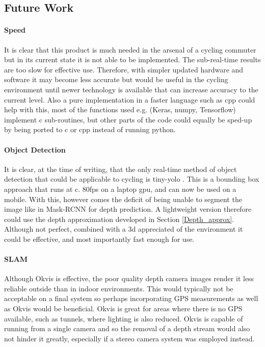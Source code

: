 \documentclass[11pt,twoside]{report}
\begin{document}
\subsection{Future Work}

\paragraph{Speed} It is clear that this product is much needed in the arsenal of a cycling commuter but in its current state it is not able to be implemented. The sub-real-time results are too slow for effective use. Therefore, with simpler updated hardware and software it may become less accurate but would be useful in the cycling environment until newer technology is available that can increase accuracy to the current level. Also a pure implementation in a faster language such as cpp could help with this, most of the functions used e.g. (Keras, numpy, Tensorflow) implement c sub-routines, but other parts of the code could equally be sped-up by being ported to c or cpp instead of running python.

\paragraph{Object Detection} It is clear, at the time of writing, that the only real-time method of object detection that could be applicable to cycling is tiny-yolo \cite{DBLP:journals/corr/RedmonDGF15}. This is a bounding box approach that runs at c. 80fps on a laptop gpu, and can now be used on a mobile. With this, however comes the deficit of being unable to segment the image like in Mask-RCNN for depth prediction. A lightweight version therefore could use the depth approximation developed in Section \ref{Depth_approx}. Although not perfect, combined with a 3d appreciated of the environment it could be effective, and most importantly fast enough for use. 

\paragraph{SLAM} Although Okvis is effective, the poor quality depth camera images render it less reliable outside than in indoor environments. This would typically not be acceptable on a final system so perhaps incorporating GPS measurements as well as Okvis would be beneficial. Okvis is great for areas where there is no GPS available, such as tunnels, where lighting is also reduced. Okvis is capable of running from a single camera and so the removal of a depth stream would also not hinder it greatly, especially if a stereo camera system was employed instead.
\end{document}
